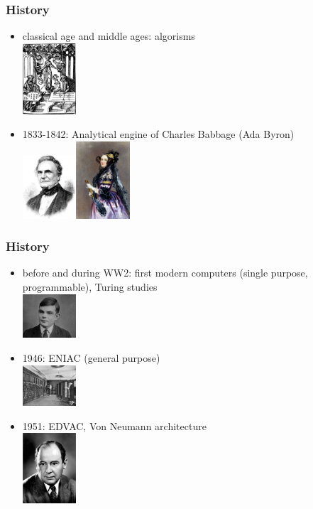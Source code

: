 \begin{frame}
  \frametitle{History}
  \begin{itemize}
  \item classical age and middle ages: \alert{algorisms} \\\includegraphics[width=2cm]{img/algorism.png}
  \item 1833-1842: \alert{Analytical engine} of Charles
    Babbage (Ada Byron) \\\includegraphics[width=2cm]{img/babbage.jpg}\includegraphics[width=2cm]{img/lovelace.jpg}
  \end{itemize}
\end{frame}

\begin{frame}
  \frametitle{History}
  \begin{itemize}
  \item before and during WW2: first modern computers (single purpose,
    programmable), \alert{Turing} studies \\\includegraphics[width=2cm]{img/turing.jpg}
  \item 1946: \alert{ENIAC} (general purpose) \\\includegraphics[width=2cm]{img/eniac.jpg}
  \item 1951: \alert{EDVAC}, Von Neumann architecture \\\includegraphics[width=2cm]{img/vonNeumann.png}
  \end{itemize}
\end{frame}


